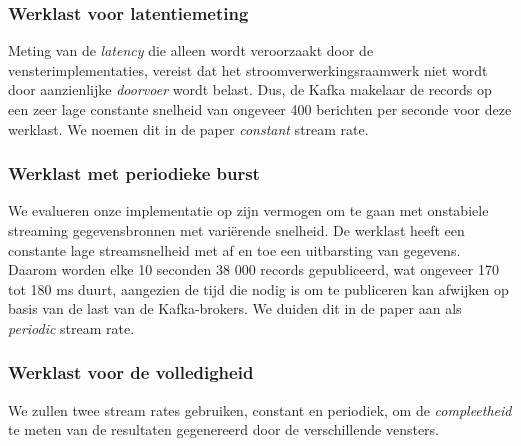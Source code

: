 \subsubsection{Werklast voor latentiemeting}
Meting van de \emph{latency} die alleen wordt veroorzaakt 
door de vensterimplementaties, vereist dat het stroomverwerkingsraamwerk niet wordt 
door aanzienlijke \emph{doorvoer} wordt belast. Dus, de Kafka makelaar 
de records op een zeer lage constante snelheid van ongeveer 400 berichten per seconde voor 
deze werklast.
We noemen dit in de paper \emph{constant} stream rate. 

\subsubsection{Werklast met periodieke burst}
We evalueren onze implementatie op zijn vermogen om te gaan met onstabiele 
streaming gegevensbronnen met variërende snelheid.
De werklast heeft een constante lage streamsnelheid met af en toe een 
uitbarsting van gegevens. Daarom worden elke 10 seconden 38 000 records gepubliceerd, wat 
ongeveer 170 tot 180 ms duurt, aangezien de tijd die nodig is om te publiceren kan afwijken op basis van de 
last van de Kafka-brokers.
We duiden dit in de paper aan als \emph{periodic} stream rate. 

\subsubsection{Werklast voor de volledigheid}
We zullen twee stream rates gebruiken, constant en periodiek, 
om de \emph{compleetheid} te meten van de resultaten gegenereerd 
door de verschillende vensters.






